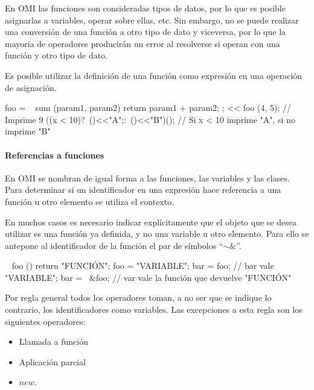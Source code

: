 En OMI las funciones son consideradas tipos de datos, por lo que es posible asignarlas 
a variables, operar sobre ellas, etc. Sin embargo, no se puede realizar una conversión
de una función a otro tipo de dato y viceversa, por lo que la mayoría de operadores producirán 
un error al resolverse si operan con una función y otro tipo de dato.

Es posible utilizar la definición de una función como expresión en una operación de asignación. \\

\begin{myverbatim}
   foo = ~ sum (param1, param2) { return param1 + param2; };
   << foo (4, 5); // Imprime 9
   ((x < 10)?~(){<<"A";}:~(){<<"B"})(); // Si x < 10 imprime "A", si no imprime "B"
\end{myverbatim}

\paragraph{Referencias a funciones }
En OMI se nombran de igual forma a las funciones, las variables y las clases. Para determinar 
si un identificador en una expresión hace referencia a una función u otro elemento se utiliza 
el contexto. 

En muchos casos es necesario indicar explícitamente que el objeto que se desea utilizar es una 
función ya definida, y no una variable u otro elemento. Para ello se antepone al identificador 
de la función el par de símbolos ``$\sim\&$''. \\




\begin{myverbatim}
   ~ foo () {
      return "FUNCIÓN";
   }
   foo = "VARIABLE";
   bar = foo; // bar vale "VARIABLE";
   bar = ~&foo; // var vale la función que devuelve "FUNCIÓN" 
\end{myverbatim}

Por regla general todos los operadores toman, a no ser que se indique lo contrario, 
los identificadores como variables. Las excepciones a esta regla son los 
siguientes operadores:

\begin {itemize}
   \item Llamada a función 
   \item Aplicación parcial
   \item $new$.
\end{itemize}

